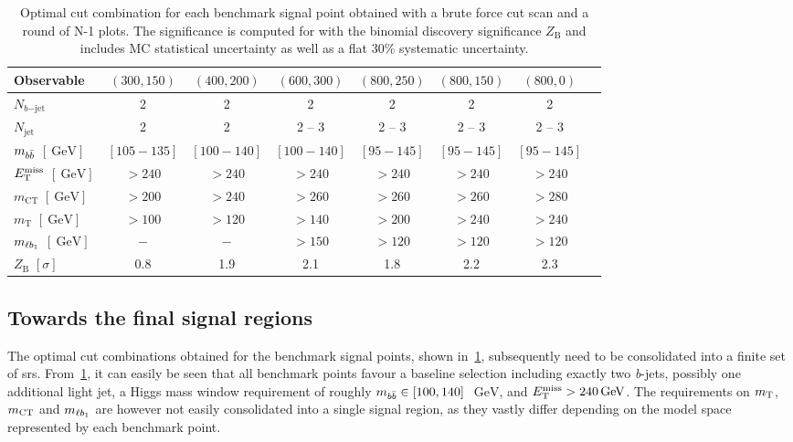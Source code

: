 \begin{table}
	\begin{center}
	\small
			\begin{tabular} {l c c c c c c c}
				\toprule
				Observable &  $(300,150)$ & $(400,200)$ & $(600,300)$  & $(800,250)$ & $(800,150)$ & $(800,0)$ \\
				\midrule
				$N_{b\mathrm{-jet}}$ &  2 & 2 & 2 & 2 & 2 & 2 \\
				$N_\mathrm{jet}$ & 2 & 2 & 2 -- 3 & 2 -- 3  & 2 -- 3 & 2 -- 3\\
				$m_{b\bar{b}}$  $[\SI{}{\GeV}]$& $[105-135]$ & $[100-140]$ & $[100-140]$ & $[95-145]$ & $[95-145]$ & $[95-145]$ \\
				$E_{\textrm{T}}^{\textrm{miss}}$ $[\SI{}{\GeV}]$ & $>240$ & $>240$ & $>240$ & $>240$ & $>240$  & $>240$\\
				$m_\mathrm{CT}$ $[\SI{}{\GeV}]$ &  $>200$ & $>240$ & $>260$ & $>260$ & $>260$   & $>280$ \\
				$m_\mathrm{T}$ $[\SI{}{\GeV}]$ &  $>100$ & $>120$ & $>140$ & $>200$ & $>240$ & $>240$ \\
				$m_{\ell b_{1}}$ $[\SI{}{\GeV}]$ &  $-$ & $-$ & $>150$ & $>120$ & $>120$ & $>120$ \\
				\midrule
				$Z_\mathrm{B}$ $[\sigma]$ & \multicolumn{1}{c}{0.8} & \multicolumn{1}{c}{1.9} & \multicolumn{1}{c}{2.1} & \multicolumn{1}{c}{1.8} & \multicolumn{1}{c}{2.2} & \multicolumn{1}{c}{2.3} \\
				\bottomrule
			\end{tabular}
		\caption{Optimal cut combination for each benchmark signal point obtained with a brute force cut scan and a round of N-1 plots. The significance is computed for \onethirtynineifb with the binomial discovery significance $Z_\mathrm{B}$ and includes MC statistical uncertainty as well as a flat 30\% systematic uncertainty.}
		\label{tab:cut_scan_results}
	\end{center}
\end{table}




\subsection{Towards the final signal regions}

The optimal cut combinations obtained for the benchmark signal points, shown in~\cref{tab:cut_scan_results}, subsequently need to be consolidated into a finite set of \glspl{sr}. From~\cref{tab:cut_scan_results}, it can easily be seen that all benchmark points favour a baseline selection including exactly two \textit{b}-jets, possibly one additional light jet, a Higgs mass window requirement of roughly $m_{b\bar{b}}\in [100,140]$~$\SI{}{\GeV}$, and $\etmiss > \SI{240}{\GeV}$. The requirements on $m_{\textrm{T}}$, $m_{\textrm{CT}}$ and $m_{\ell b_{1}}$ are however not easily consolidated into a single signal region, as they vastly differ depending on the model space represented by each benchmark point.

